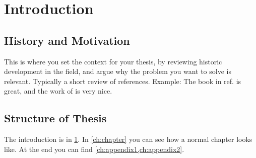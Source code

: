 \chapter{Introduction}\label{ch:introduction}


\section{History and Motivation}

This is where you set the context for your thesis, by reviewing historic development in the field, and argue why the problem you want to solve is relevant.
Typically a short review of references. Example: The book in ref. \cite{altland2010condensed} is great, and the work of \citet{Thouless1982,Tomonaga1950} is very nice.
\section{Structure of Thesis}

The introduction is in \cref{ch:introduction}. In \cref{ch:chapter} you can see how a normal chapter looks like.
At the end you can find \cref{ch:appendix1,ch:appendix2}.

